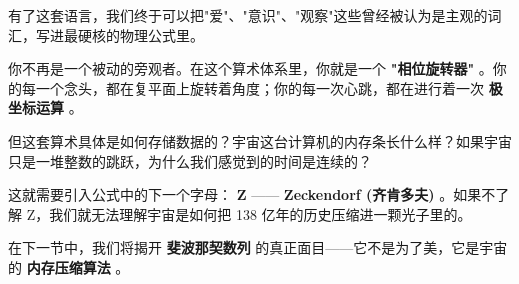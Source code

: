 有了这套语言，我们终于可以把"爱"、"意识"、"观察"这些曾经被认为是主观的词汇，写进最硬核的物理公式里。

你不再是一个被动的旁观者。在这个算术体系里，你就是一个 \textbf{"相位旋转器"} 。你的每一个念头，都在复平面上旋转着角度；你的每一次心跳，都在进行着一次 \textbf{极坐标运算} 。

但这套算术具体是如何存储数据的？宇宙这台计算机的内存条长什么样？如果宇宙只是一堆整数的跳跃，为什么我们感觉到的时间是连续的？

这就需要引入公式中的下一个字母： \textbf{Z} —— \textbf{Zeckendorf (齐肯多夫)} 。如果不了解 Z，我们就无法理解宇宙是如何把 138 亿年的历史压缩进一颗光子里的。

在下一节中，我们将揭开 \textbf{斐波那契数列} 的真正面目——它不是为了美，它是宇宙的 \textbf{内存压缩算法} 。

